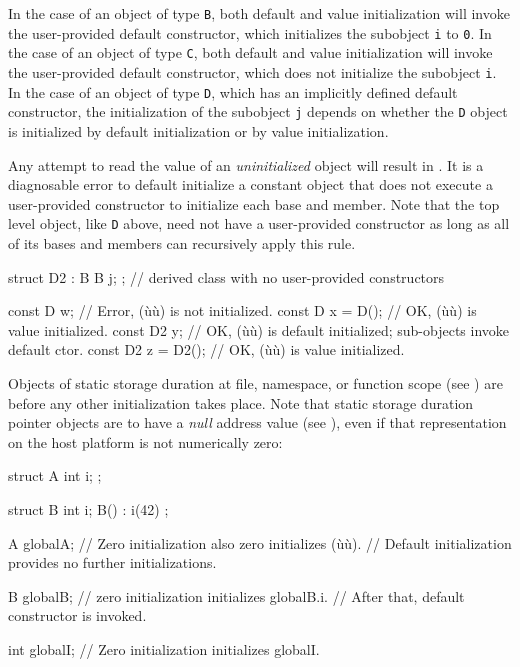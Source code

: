 \noindent In the case of an object of type \lstinline!B!, both default and value
initialization will invoke the user-provided default constructor, which
initializes the subobject \lstinline!i! to \lstinline!0!. In the case of an
object of type \lstinline!C!, both default and value initialization will
invoke the user-provided default constructor, which does not initialize
the subobject \lstinline!i!. In the case of an object of type \lstinline!D!,
which has an implicitly defined default constructor, the initialization
of the subobject \lstinline!j! depends on whether the \lstinline!D! object is
initialized by default initialization or by value initialization.

Any attempt to read the value of an \emph{uninitialized} object will
result in . It is a diagnosable error to
default initialize a constant object that does not execute a
user-provided constructor to initialize each base and member. Note that
the top level object, like \lstinline!D! above, need not have a
user-provided constructor as long as all of its bases and members can
recursively apply this rule.

\begin{emcppslisting}[emcppsbatch=e1]
struct D2 : B { B j; };  // derived class with no user-provided constructors

const D  w;         // Error, (ù{}ù) is not initialized.
const D  x = D();   // OK, (ù{}ù) is value initialized.
const D2 y;         // OK, (ù{}ù) is default initialized; sub-objects invoke default ctor.
const D2 z = D2();  // OK, (ù{}ù) is value initialized.
\end{emcppslisting}
    

\noindent Objects of static storage duration at file, namespace, or function scope
(see ) are
 before any other initialization takes
place. Note that  static storage
duration pointer objects are  to have a
\emph{null} address value (see ), even if that
representation on the host platform is not numerically zero:

\begin{emcppslisting}
struct A
{
    int i;
};

struct B
{
    int i;
    B() : i(42) { }
};

A globalA;
    // Zero initialization also zero initializes (ù{}ù).
    // Default initialization provides no further initializations.

B globalB;
    // zero initialization initializes globalB.i.
    // After that, default constructor is invoked.

int globalI;
    // Zero initialization initializes globalI.
\end{emcppslisting}
    

